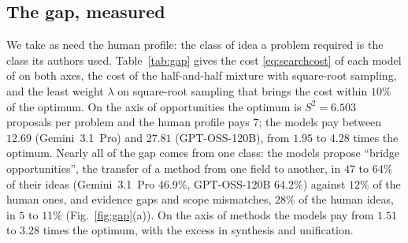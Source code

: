 \subsection{The gap, measured}

We take as need the human profile: the class of idea a problem required is the class its authors used. Table~\ref{tab:gap} gives the cost \eqref{eq:searchcost} of each model of \cite{CZC26} on both axes, the cost of the half-and-half mixture with square-root sampling, and the least weight $\lambda$ on square-root sampling that brings the cost within $10\%$ of the optimum. On the axis of opportunities the optimum is $S^{2}=6.503$ proposals per problem and the human profile pays $7$; the models pay between $12.69$ (Gemini~3.1~Pro) and $27.81$ (GPT-OSS-120B), from $1.95$ to $4.28$ times the optimum. Nearly all of the gap comes from one class: the models propose ``bridge opportunities'', the transfer of a method from one field to another, in $47$ to $64\%$ of their ideas (Gemini~3.1~Pro $46.9\%$, GPT-OSS-120B $64.2\%$) against $12\%$ of the human ones, and evidence gaps and scope mismatches, $28\%$ of the human ideas, in $5$ to $11\%$ (Fig.~\ref{fig:gap}(a)). On the axis of methods the models pay from $1.51$ to $3.28$ times the optimum, with the excess in synthesis and unification.


